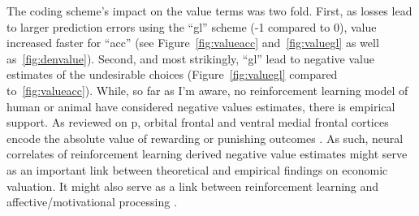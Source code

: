 \documentclass[doc,12pt]{apa}        %
\begin{document}
The coding scheme's impact on the value terms was two fold.  First, as losses lead to larger prediction errors using the ``gl'' scheme (-1 compared to 0), value increased faster for ``acc'' (see Figure~\ref{fig:valueacc} and~\ref{fig:valuegl} as well as~\ref{fig:denvalue}).  Second, and most strikingly, ``gl'' lead to negative value estimates of the undesirable choices (Figure~\ref{fig:valuegl} compared to~\ref{fig:valueacc}).  While, so far as I'm aware, no reinforcement learning model of human or animal have considered negative values estimates, there is empirical support.  As reviewed on p\pageref{subsub:fclt}, orbital frontal and ventral medial frontal cortices encode the absolute value of rewarding or punishing outcomes \cite{ODoherty:2001p2423,Hornak:2004p6234}.  As such, neural correlates of reinforcement learning derived negative value estimates might serve as an important link between theoretical and empirical findings on economic valuation.  It might also serve as a link between reinforcement learning and affective/motivational processing \cite{Knutson:2005p1627,Delgado:2004p6665}.
\end{document}
